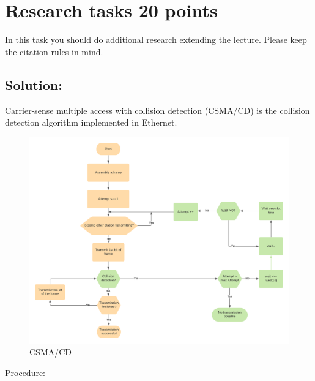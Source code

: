 \documentclass{resources/WeSTassignment}
\begin{document}
\section{Research tasks \hfill {20 points}}
In this task you should do additional research extending the lecture. Please keep the citation rules in mind.

\subsection{Solution:}
Carrier-sense multiple access with collision detection (CSMA/CD) is the collision detection algorithm implemented in Ethernet.
\begin{figure}[htbp]
\centerline{\includegraphics[scale=.2]{./resources/CSMACD.png}}
\caption{CSMA/CD}
\label{fig}
\end{figure}
Procedure:
\end{document}
